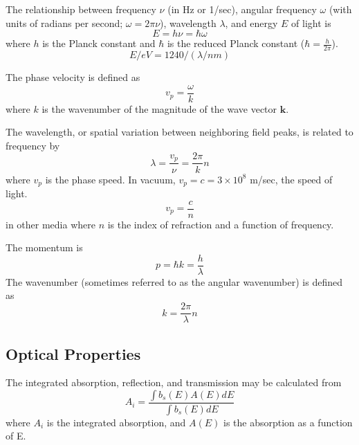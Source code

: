 \documentclass[12pt]{article}
\begin{document}
The relationship between frequency $\nu$ (in Hz or 1/sec), angular frequency $\omega$ (with units of radians per second; $\omega = 2 \pi \nu$), wavelength $\lambda$, and energy $E$ of light is
\begin{equation}
\boxed{E = h \nu =  \hbar \omega} \label{eq:energy}
\end{equation}
where $h$ is the Planck constant and $\hbar$ is the reduced Planck constant ($\hbar = \frac{h}{2 \pi}$).
\begin{equation} 
\boxed{E/eV = 1240/(\lambda/nm)}
\end{equation}

The phase velocity is defined as 
\begin{equation}
\boxed{v_p = \frac{\omega}{k}} \label{eq:phaseVelocity}
\end{equation}
where $k$ is the wavenumber of the magnitude of the wave vector $\mathbf{k}$.  

The wavelength, or spatial variation between neighboring field peaks, is related to frequency by 
\begin{equation}
\boxed{\lambda = \frac{v_p}{\nu} = \frac{2 \pi}{k} n}
\end{equation}
where $v_p$ is the phase speed.  %
In vacuum, $v_p = c = 3 \times 10^8$ m/sec, the speed of light.  
\begin{equation}
\boxed{v_p = \frac{c}{n}} \label{eq:phaseVelocity2}
\end{equation}
 in other media where $n$ is the index of refraction and a function of frequency.      



The momentum is 
\begin{equation}
\boxed{p = \hbar k= \frac{h}{\lambda}}
\end{equation}
The wavenumber (sometimes referred to as the angular wavenumber) is defined as 
\begin{equation}
\boxed{k = \frac{2 \pi}{\lambda} n}
\end{equation}

\subsection{Optical Properties}

The integrated absorption, reflection, and transmission may be calculated from 
\begin{equation}
A_i = \frac{\int b_s(E) A(E) dE}{\int b_s(E) dE} 
\end{equation}
where $A_i$ is the integrated absorption, and $A(E)$ is the absorption as a function of E.  
\end{document}
